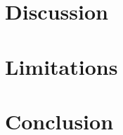 \documentclass[11pt]{article}
\newcommand{\bioformer}{\textsc{BioFormer}}
\begin{document}
\section{Discussion}


\section{Limitations}


\section{Conclusion}







\end{document}
